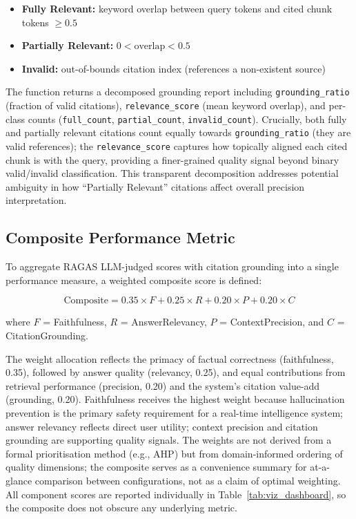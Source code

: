\begin{itemize}[leftmargin=0.5in]
  \item \textbf{Fully Relevant:} keyword overlap between query tokens and cited chunk tokens $\geq 0.5$
  \item \textbf{Partially Relevant:} $0 < \text{overlap} < 0.5$
  \item \textbf{Invalid:} out-of-bounds citation index (references a non-existent source)
\end{itemize}

\noindent The function returns a decomposed grounding report including \texttt{grounding\_ratio} (fraction of valid citations), \texttt{relevance\_score} (mean keyword overlap), and per-class counts (\texttt{full\_count}, \texttt{partial\_count}, \texttt{invalid\_count}). Crucially, both fully and partially relevant citations count equally towards \texttt{grounding\_ratio} (they are valid references); the \texttt{relevance\_score} captures how topically aligned each cited chunk is with the query, providing a finer-grained quality signal beyond binary valid/invalid classification. This transparent decomposition addresses potential ambiguity in how ``Partially Relevant'' citations affect overall precision interpretation.

\subsection{Composite Performance Metric}
\label{sec:composite}

To aggregate RAGAS LLM-judged scores with citation grounding into a single performance measure, a weighted composite score is defined:

\begin{equation}
  \text{Composite} = 0.35 \times F + 0.25 \times R + 0.20 \times P + 0.20 \times C
  \label{eq:composite}
\end{equation}

\noindent where $F$ = Faithfulness, $R$ = AnswerRelevancy, $P$ = ContextPrecision, and $C$ = CitationGrounding.

\noindent The weight allocation reflects the primacy of factual correctness (faithfulness, 0.35), followed by answer quality (relevancy, 0.25), and equal contributions from retrieval performance (precision, 0.20) and the system's citation value-add (grounding, 0.20). Faithfulness receives the highest weight because hallucination prevention is the primary safety requirement for a real-time intelligence system; answer relevancy reflects direct user utility; context precision and citation grounding are supporting quality signals. The weights are not derived from a formal prioritisation method (e.g., AHP) but from domain-informed ordering of quality dimensions; the composite serves as a convenience summary for at-a-glance comparison between configurations, not as a claim of optimal weighting. All component scores are reported individually in Table~\ref{tab:viz_dashboard}, so the composite does not obscure any underlying metric.

